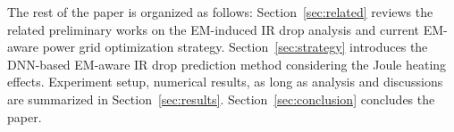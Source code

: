The rest of the paper is organized as follows:
Section~\ref{sec:related} reviews the related preliminary works on the
EM-induced IR drop analysis and current EM-aware power grid
optimization strategy. Section~\ref{sec:strategy} introduces the
DNN-based EM-aware IR drop prediction method considering the Joule
heating effects. Experiment setup, numerical results, as long as
analysis and discussions are summarized in Section~\ref{sec:results}.
Section~\ref{sec:conclusion} concludes the paper.
